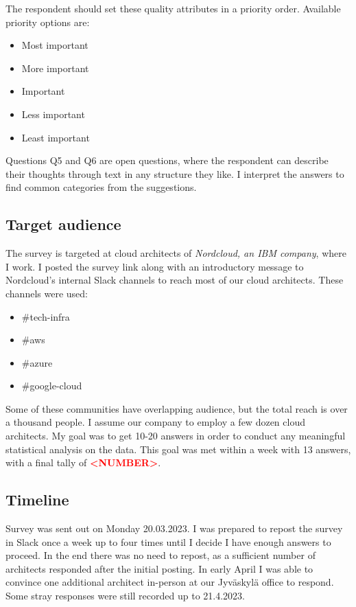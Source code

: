 \documentclass[utf8,english]{gradu3}
\newcommand{\todo}[1]{\textbf{\textcolor{red}{#1}}}
\begin{document}
The respondent should set these quality attributes in a priority order.
Available priority options are:
\begin{itemize}
  \item Most important
  \item More important
  \item Important
  \item Less important
  \item Least important
\end{itemize}

Questions Q5 and Q6 are open questions, where the respondent can describe their
thoughts through text in any structure they like.
I interpret the answers to find common categories from the suggestions.

\subsection{Target audience}
The survey is targeted at cloud architects of \textit{Nordcloud, an IBM company}, where I work.
I posted the survey link along with an introductory message to Nordcloud's
internal Slack channels to reach most of our cloud architects.
These channels were used:
\begin{itemize}
  \item \#tech-infra
  \item \#aws
  \item \#azure
  \item \#google-cloud
\end{itemize}

Some of these communities have overlapping audience, but the total reach is over a thousand people.
I assume our company to employ a few dozen cloud architects.
My goal was to get 10-20 answers in order to conduct any meaningful statistical analysis on
the data.
This goal was met within a week with 13 answers, with a final tally of \todo{<NUMBER>}.

\subsection{Timeline}
Survey was sent out on Monday 20.03.2023.
I was prepared to repost the survey in Slack once a week up to four times until I
decide I have enough answers to proceed.
In the end there was no need to repost, as a sufficient number of architects
responded after the initial posting.
In early April I was able to convince one additional architect in-person at our
Jyväskylä office to respond.
Some stray responses were still recorded up to 21.4.2023.
\end{document}
